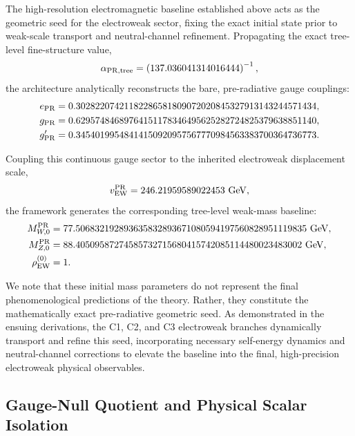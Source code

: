 \documentclass[11pt]{article}
\begin{document}
The high-resolution electromagnetic baseline established above acts as the geometric seed for the electroweak sector, fixing the exact initial state prior to weak-scale transport and neutral-channel refinement. Propagating the exact tree-level fine-structure value,
\begin{equation}
\alpha_{\rm PR,tree}=\left(137.036041314016444\right)^{-1},
\end{equation}
the architecture analytically reconstructs the bare, pre-radiative gauge couplings:
\begin{align}
 e_{\rm PR} &=0.30282207421182286581809072020845327913143244571434,\\
 g_{\rm PR} &=0.62957484689764151178346495625282724825379638851140,\\
 g'_{\rm PR} &=0.34540199548414150920957567770984563383700364736773.
\end{align}

Coupling this continuous gauge sector to the inherited electroweak displacement scale,
\begin{equation}
v_{\rm EW}^{\rm PR}=246.21959589022453\ {\rm GeV},
\end{equation}
the framework generates the corresponding tree-level weak-mass baseline:
\begin{align}
M_{W,0}^{\rm PR}&=77.506832192893635832893671080594197560828951119835\ {\rm GeV},\\
M_{Z,0}^{\rm PR}&=88.40509587274585732715680415742085114480023483002\ {\rm GeV},\\
\rho_{\rm EW}^{(0)}&=1.
\end{align}

We note that these initial mass parameters do not represent the final phenomenological predictions of the theory. Rather, they constitute the mathematically exact pre-radiative geometric seed. As demonstrated in the ensuing derivations, the C1, C2, and C3 electroweak branches dynamically transport and refine this seed, incorporating necessary self-energy dynamics and neutral-channel corrections to elevate the baseline into the final, high-precision electroweak physical observables.

\subsection{Gauge-Null Quotient and Physical Scalar Isolation}
\label{subsec:priii-gauge-null-quotient-preview}
\end{document}
